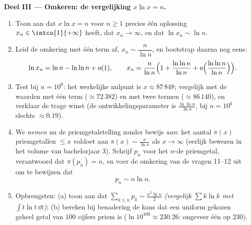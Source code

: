 \begin{problem}
\medskip
\noindent\textbf{Deel III --- Omkeren: de vergelijking $x\ln x =
n$.}
\begin{enumerate}[resume]
  \item Toon aan dat $x\ln x = n$ voor $n \geq 1$ precies één
        oplossing $x_n \in \intco{1}{+\infty}$ heeft, dat $x_n \to
        \infty$, en dat $\ln x_n \sim \ln n$.
  \item Leid de omkering met één term af, $x_n \sim
        \dfrac{n}{\ln n}$, en bootstrap daarna nog eens:
        \[
        \ln x_n = \ln n - \ln\ln n + o(1),
        \qquad
        x_n = \frac{n}{\ln n}\Bigl(1 + \frac{\ln\ln n}{\ln n}
        + o\Bigl(\frac{\ln\ln n}{\ln n}\Bigr)\Bigr).
        \]
  \item Test bij $n = 10^6$: het werkelijke nulpunt is $x \approx
        87\,848$; vergelijk met de waarden met één term ($\approx
        72\,382$) en met twee termen ($\approx 86\,140$), en
        verklaar de trage winst (de ontwikkelingsparameter is
        $\frac{\ln\ln n}{\ln n}$, bij $n = 10^6$ slechts $\approx
        0.19$).
  \item We \emph{nemen} nu de priemgetalstelling zonder bewijs
        \emph{aan}: het aantal $\pi(x)$ priemgetallen $\leq x$
        voldoet aan $\pi(x) \sim \frac{x}{\ln x}$ als $x \to
        \infty$ (eerlijk bewezen in het volume van bachelorjaar
        3). Schrijf $p_n$ voor het $n$-de priemgetal, verantwoord
        dat $\pi(p_n) = n$, en voer de omkering van de vragen
        11--12 uit om te bewijzen dat
        \[
        p_n \sim n \ln n .
        \]
  \item Opbrengsten: (a) toon aan dat $\sum_{k \leq n} p_k \sim
        \frac{n^2\ln n}{2}$ \emph{(vergelijk $\sum k\ln k$ met
        $\int t\ln t\,\dd t$)}; (b) bereken bij benadering de kans
        dat een uniform gekozen geheel getal van $100$ cijfers
        priem is ($\ln 10^{100} \approx 230.26$: ongeveer één op
        $230$).
\end{enumerate}


\end{problem}
